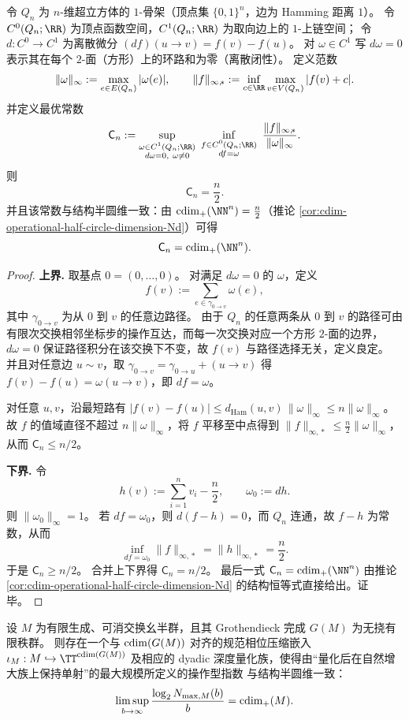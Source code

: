 \begin{theorem}\label{thm:cdim-plus-discrete-stokes-inversion-hypercube}
令 \(Q_n\) 为 \(n\)-维超立方体的 \(1\)-骨架（顶点集 \(\{0,1\}^n\)，边为 Hamming 距离 \(1\)）。
令 \(C^0(Q_n;\RR)\) 为顶点函数空间，\(C^1(Q_n;\RR)\) 为取向边上的 \(1\)-上链空间；
令 \(d:C^0\to C^1\) 为离散微分 \((df)(u\to v)=f(v)-f(u)\)。
对 \(\omega\in C^1\) 写 \(d\omega=0\) 表示其在每个 \(2\)-面（方形）上的环路和为零（离散闭性）。
定义范数
\[
\|\omega\|_\infty:=\max_{e\in E(Q_n)}|\omega(e)|,\qquad
\|f\|_{\infty,\!*}:=\inf_{c\in\RR}\max_{v\in V(Q_n)}|f(v)+c|.
\]
并定义最优常数
\[
\mathsf C_n:=
\sup_{\substack{\omega\in C^1(Q_n;\RR)\\ d\omega=0,\ \omega\neq 0}}
\ \inf_{\substack{f\in C^0(Q_n;\RR)\\ df=\omega}}
\ \frac{\|f\|_{\infty,\!*}}{\|\omega\|_\infty}.
\]
则
\[
\mathsf C_n=\frac{n}{2}.
\]
并且该常数与结构半圆维一致：由 \(\cdim_+(\NN^n)=\frac{n}{2}\)（推论 \ref{cor:cdim-operational-half-circle-dimension-Nd}）可得
\[
\mathsf C_n=\cdim_+(\NN^n).
\]
\end{theorem}
\begin{proof}
\textbf{上界.}
取基点 \(0=(0,\dots,0)\)。
对满足 \(d\omega=0\) 的 \(\omega\)，定义
\[
f(v):=\sum_{e\in\gamma_{0\to v}}\omega(e),
\]
其中 \(\gamma_{0\to v}\) 为从 \(0\) 到 \(v\) 的任意边路径。
由于 \(Q_n\) 的任意两条从 \(0\) 到 \(v\) 的路径可由有限次交换相邻坐标步的操作互达，而每一次交换对应一个方形 \(2\)-面的边界，
\(d\omega=0\) 保证路径积分在该交换下不变，故 \(f(v)\) 与路径选择无关，定义良定。
并且对任意边 \(u\sim v\)，取 \(\gamma_{0\to v}=\gamma_{0\to u}+(u\to v)\) 得
\(
f(v)-f(u)=\omega(u\to v)
\)，即 \(df=\omega\)。
\par
对任意 \(u,v\)，沿最短路有
\(
|f(v)-f(u)|\le d_{\mathrm{Ham}}(u,v)\,\|\omega\|_\infty\le n\|\omega\|_\infty
\)。
故 \(f\) 的值域直径不超过 \(n\|\omega\|_\infty\)，将 \(f\) 平移至中点得到
\(
\|f\|_{\infty,\!*}\le \frac{n}{2}\|\omega\|_\infty
\)，从而 \(\mathsf C_n\le n/2\)。
\par
\textbf{下界.}
令
\[
h(v):=\sum_{i=1}^n v_i-\frac{n}{2},
\qquad
\omega_0:=dh.
\]
则 \(\|\omega_0\|_\infty=1\)。
若 \(df=\omega_0\)，则 \(d(f-h)=0\)，而 \(Q_n\) 连通，故 \(f-h\) 为常数，从而
\[
\inf_{df=\omega_0}\|f\|_{\infty,\!*}=\|h\|_{\infty,\!*}=\frac{n}{2}.
\]
于是 \(\mathsf C_n\ge n/2\)。
合并上下界得 \(\mathsf C_n=n/2\)。
最后一式 \(\mathsf C_n=\cdim_+(\NN^n)\) 由推论 \ref{cor:cdim-operational-half-circle-dimension-Nd} 的结构恒等式直接给出。证毕。
\end{proof}

\begin{conjecture}\label{conj:cdim-operational-half-circle-dimension-general-monoid}
设 \(M\) 为有限生成、可消交换幺半群，且其 Grothendieck 完成 \(G(M)\) 为无挠有限秩群。
则存在一个与 \(\operatorname{cdim}(G(M))\) 对齐的规范相位压缩嵌入
\(
\iota_M:M\hookrightarrow \TT^{\cdim(G(M))}
\)
及相应的 dyadic 深度量化族，使得由“量化后在自然增大族上保持单射”的最大规模所定义的操作型指数
与结构半圆维一致：
\[
\limsup_{b\to\infty}\frac{\log_2 N_{\max,M}(b)}{b}=\operatorname{cdim}_+(M).
\]
\end{conjecture}

\endinput
